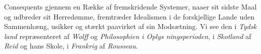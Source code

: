\documentclass[12pt,a4paper]{book}
\begin{document}
Consequents gjennem en Række af fremskridende Systemer,
naaer sit sidste Maal og udbreder sit Herredømme, fremtræder
Idealismen i de forskjellige Lande uden Sammenhæng, usikker
og stærkt paavirket af sin Modsætning. Vi see den i \emph{Tydsk\-%
land} repræsenteret af \emph{Wolff} og \emph{Philosophien i Oplys\-%
ningsperioden}, i \emph{Skotland} af \emph{Reid} og hans Skole, i
\emph{Frankrig} af \emph{Rousseau}.
\end{document}
